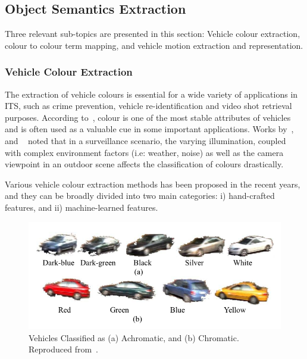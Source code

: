 \vspace{1em}
\subsection{Object Semantics Extraction}

Three relevant sub-topics are presented in this section: Vehicle colour extraction, colour to colour term mapping, and vehicle motion extraction and representation.

\vspace{1em}
\subsubsection{Vehicle Colour Extraction}
The extraction of vehicle colours is essential for a wide variety of
applications in ITS, such as crime prevention, vehicle re-identification and video shot retrieval purposes.
According to~, colour is one of the
most stable attributes of vehicles and is often used as a valuable cue in some
important applications. Works by~,~ and
~ noted that in a surveillance scenario, the varying
illumination, coupled with complex environment factors (i.e: weather, noise) as well as the camera viewpoint in an outdoor scene affects the classification of colours drastically. 


Various vehicle colour extraction methods has been proposed in the recent
years, and they can be broadly divided into two main categories:
i) hand-crafted features, and ii) machine-learned features. 

\begin{figure}[hbt!]
 \centering
 \includegraphics[width=.8\textwidth]{image/lit/carscolors.png}
 \caption[Colour Appearance Categories of Vehicle Used for Colour
 Classification]{Vehicles Classified as (a) Achromatic, and 
 (b) Chromatic. Reproduced from~.}
\label{fig:sevenclasses}
\end{figure}


